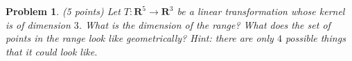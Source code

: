 \documentclass{article}
\theoremstyle{problemstyle}
\newtheorem{problem}{Problem}
\theoremstyle{problemstyle}
\newtheorem{solution}{Solution}
\theoremstyle{problemstyle}
\begin{document}
% 


\begin{problem}
(5 points) Let $T:\textbf{R}^5 \rightarrow \textbf{R}^3$ be a linear transformation whose kernel is of dimension $3$. What is the dimension of the range? What does the set of points in the range look like geometrically? Hint: there are only $4$ possible things that it could look like.  
\end{problem}

\end{document}
